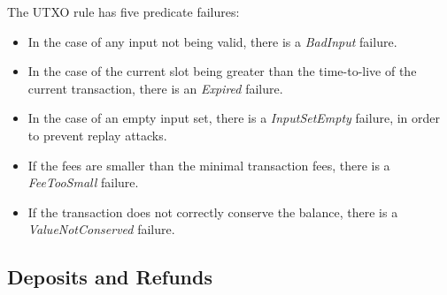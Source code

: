 The UTXO rule has five predicate failures:
\begin{itemize}
\item In the case of any input not being valid, there is a \emph{BadInput}
  failure.
\item In the case of the current slot being greater than the time-to-live of the
  current transaction, there is an \emph{Expired} failure.
\item In the case of an empty input set, there is a \emph{InputSetEmpty} failure,
  in order to prevent replay attacks.
\item If the fees are smaller than the minimal transaction fees, there is a
  \emph{FeeTooSmall} failure.
\item If the transaction does not correctly conserve the balance, there is a
  \emph{ValueNotConserved} failure.
\end{itemize}

\clearpage

\subsection{Deposits and Refunds}
\label{sec:deps-refunds}

